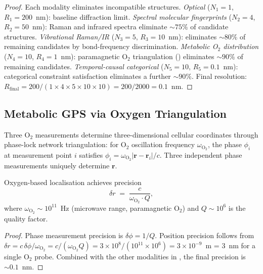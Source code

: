 \begin{proof}
Each modality eliminates incompatible structures.
\emph{Optical} ($N_1 = 1$, $R_1 = 200$~nm): baseline diffraction limit.
\emph{Spectral molecular fingerprints} ($N_2 = 4$, $R_2 = 50$~nm): Raman and
infrared spectra eliminate $\sim 75\%$ of candidate structures.
\emph{Vibrational Raman/IR} ($N_3 = 5$, $R_3 = 10$~nm): eliminates $\sim 80\%$
of remaining candidates by bond-frequency discrimination.
\emph{Metabolic O$_2$ distribution} ($N_4 = 10$, $R_4 = 1$~nm): paramagnetic
$\mathrm{O}_2$ triangulation () eliminates $\sim 90\%$
of remaining candidates.
\emph{Temporal-causal categorical} ($N_5 = 10$, $R_5 = 0.1$~nm): categorical
constraint satisfaction eliminates a further $\sim 90\%$.
Final resolution: $R_\mathrm{final} = 200/(1 \times 4 \times 5 \times 10
\times 10) = 200/2000 = 0.1$~nm.
\end{proof}

\subsection{Metabolic GPS via Oxygen Triangulation}

\begin{definition}
\label{def:o2-gps}
Three O$_2$ measurements determine three-dimensional cellular coordinates
through phase-lock network triangulation: for O$_2$ oscillation frequency
$\omega_\mathrm{O_2}$, the phase $\phi_i$ at measurement point $i$ satisfies
$\phi_i = \omega_\mathrm{O_2}|\mathbf{r} - \mathbf{r}_i|/c$.  Three
independent phase measurements uniquely determine $\mathbf{r}$.
\end{definition}

\begin{theorem}
\label{thm:o2-precision}
Oxygen-based localisation achieves precision
\[
    \delta r \;=\; \frac{c}{\omega_\mathrm{O_2} \cdot Q},
\]
where $\omega_\mathrm{O_2} \sim 10^{11}$~Hz (microwave range, paramagnetic
$\mathrm{O}_2$) and $Q \sim 10^6$ is the quality factor.
\end{theorem}

\begin{proof}
Phase measurement precision is $\delta\phi = 1/Q$.  Position precision
follows from $\delta r = c\,\delta\phi / \omega_\mathrm{O_2} = c/(\omega_\mathrm{O_2} Q)
= 3 \times 10^8 / (10^{11} \times 10^6) = 3 \times 10^{-9}$~m = 3~nm for
a single O$_2$ probe.  Combined with the other modalities in
, the final precision is $\sim 0.1$~nm.
\end{proof}

